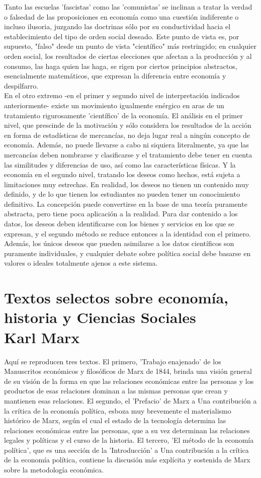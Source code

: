 Tanto las escuelas 'fascistas' como las 'comunistas' se inclinan a tratar la verdad o falsedad de las proposiciones en economía como una cuestión indiferente o incluso ilusoria, juzgando las doctrinas sólo por su conductividad hacia el establecimiento del tipo de orden social deseado. Este punto de vista es, por supuesto, "falso" desde un punto de vista "científico" más restringido; en cualquier orden social, los resultados de ciertas elecciones que afectan a la producción y al consumo, las haga quien las haga, se rigen por ciertos principios abstractos, esencialmente matemáticos, que expresan la diferencia entre economía y despilfarro. \\

En el otro extremo -en el primer y segundo nivel de interpretación indicados anteriormente- existe un movimiento igualmente enérgico en aras de un tratamiento rigurosamente 'científico' de la economía. El análisis en el primer nivel, que prescinde de la motivación y sólo considera los resultados de la acción en forma de estadísticas de mercancías, no deja lugar real a ningún concepto de economía. Además, no puede llevarse a cabo ni siquiera literalmente, ya que las mercancías deben nombrarse y clasificarse y el tratamiento debe tener en cuenta las similitudes y diferencias de uso, así como las características físicas. Y la economía en el segundo nivel, tratando los deseos como hechos, está sujeta a limitaciones muy estrechas. En realidad, los deseos no tienen un contenido muy definido, y de lo que tienen los estudiantes no pueden tener un conocimiento definitivo. La concepción puede convertirse en la base de una teoría puramente abstracta, pero tiene poca aplicación a la realidad. Para dar contenido a los datos, los deseos deben identificarse con los bienes y servicios en los que se expresan, y el segundo método se reduce entonces a la identidad con el primero. Además, los únicos deseos que pueden asimilarse a los datos científicos son puramente individuales, y cualquier debate sobre política social debe basarse en valores o ideales totalmente ajenos a este sistema.

\chapter{Textos selectos sobre economía, historia y Ciencias Sociales\\ Karl Marx}
Aquí se reproducen tres textos. El primero, 'Trabajo enajenado' de los Manuscritos económicos y filosóficos de Marx de 1844, brinda una visión general de su visión de la forma en que las relaciones económicas entre las personas y los productos de esas relaciones dominan a las mismas personas que crean y mantienen esas relaciones. El segundo, el 'Prefacio' de Marx a Una contribución a la crítica de la economía política, esboza muy brevemente el materialismo histórico de Marx, según el cual el estado de la tecnología determina las relaciones económicas entre las personas, que a su vez determinan las relaciones legales y políticas y el curso de la historia. El tercero, 'El método de la economía política', que es una sección de la 'Introducción' a Una contribución a la crítica de la economía política, contiene la discusión más explícita y sostenida de Marx sobre la metodología económica.

